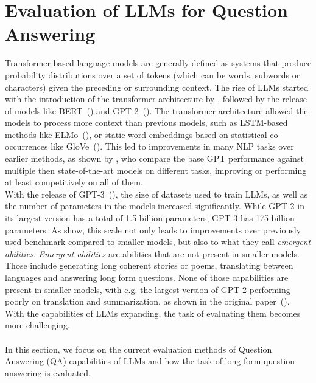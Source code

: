 \section{Evaluation of LLMs for Question Answering}\label{sec:evaluation-of-large-language-models}
Transformer-based language models are generally defined as systems that produce probability distributions over a set of tokens (which can be words, subwords or characters) given the preceding or surrounding context.    
The rise of LLMs started with the introduction of the transformer architecture by \cite{vaswani:2017:Attention}, followed by the release of models like BERT~(\cite{devlin:2018:BERT}) and GPT-2~(\cite{radford:2018:Improving}).
The transformer architecture allowed the models to process more context than previous models, such as LSTM-based methods like ELMo~(\cite{peters:2018:Deep}), or static word embeddings based on statistical co-occurrences like GloVe~(\cite{pennington:2014:Glove}).
This led to improvements in many NLP tasks over earlier methods, as shown by \cite{radford:2018:Improving}, who compare the base GPT performance against multiple then state-of-the-art models on different tasks, improving or performing at least competitively on all of them.
\\
With the release of GPT-3~(\cite{brown:2020:Language}), the size of datasets used to train LLMs, as well as the number of parameters in the models increased significantly.
While GPT-2 in its largest version has a total of 1.5 billion parameters, GPT-3 has 175 billion parameters.
As \cite{wei:2022:Emergent} show, this scale not only leads to improvements over previously used benchmark compared to smaller models, but also to what they call \textit{emergent abilities}.
\textit{Emergent abilities} are abilities that are not present in smaller models.
Those include generating long coherent stories or poems, translating between languages and answering long form questions.
None of those capabilities are present in smaller models, with e.g. the largest version of GPT-2 performing poorly on translation and summarization, as shown in the original paper~(\cite{radford:2018:Improving}).
\\
With the capabilities of LLMs expanding, the task of evaluating them becomes more challenging.
\\\\
In this section, we focus on the current evaluation methods of Question Answering (QA) capabilities of LLMs and how the task of long form question answering is evaluated.
\\
